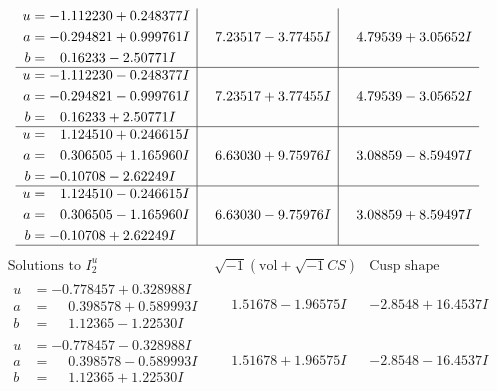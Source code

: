 \documentclass[1p]{elsarticle_modified}
\theoremstyle{definition}
\newcommand{\I}{\sqrt{-1}}
\begin{document}
$$\begin{array}{c|c|c}
\begin{aligned}
u &= -1.112230 + 0.248377 I \\
a &= -0.294821 + 0.999761 I \\
b &= \phantom{-}0.16233 - 2.50771 I\end{aligned}
 & \phantom{-}7.23517 - 3.77455 I & \phantom{-}4.79539 + 3.05652 I \\ \hline\begin{aligned}
u &= -1.112230 - 0.248377 I \\
a &= -0.294821 - 0.999761 I \\
b &= \phantom{-}0.16233 + 2.50771 I\end{aligned}
 & \phantom{-}7.23517 + 3.77455 I & \phantom{-}4.79539 - 3.05652 I \\ \hline\begin{aligned}
u &= \phantom{-}1.124510 + 0.246615 I \\
a &= \phantom{-}0.306505 + 1.165960 I \\
b &= -0.10708 - 2.62249 I\end{aligned}
 & \phantom{-}6.63030 + 9.75976 I & \phantom{-}3.08859 - 8.59497 I \\ \hline\begin{aligned}
u &= \phantom{-}1.124510 - 0.246615 I \\
a &= \phantom{-}0.306505 - 1.165960 I \\
b &= -0.10708 + 2.62249 I\end{aligned}
 & \phantom{-}6.63030 - 9.75976 I & \phantom{-}3.08859 + 8.59497 I\\
 \hline 
 \end{array}$$\newpage$$\begin{array}{c|c|c}  
\text{Solutions to }I^u_{2}& \I (\text{vol} + \sqrt{-1}CS) & \text{Cusp shape}\\
 \hline 
\begin{aligned}
u &= -0.778457 + 0.328988 I \\
a &= \phantom{-}0.398578 + 0.589993 I \\
b &= \phantom{-}1.12365 - 1.22530 I\end{aligned}
 & \phantom{-}1.51678 - 1.96575 I & -2.8548 + 16.4537 I \\ \hline\begin{aligned}
u &= -0.778457 - 0.328988 I \\
a &= \phantom{-}0.398578 - 0.589993 I \\
b &= \phantom{-}1.12365 + 1.22530 I\end{aligned}
 & \phantom{-}1.51678 + 1.96575 I & -2.8548 - 16.4537 I \\ \hline\begin{aligned}

\end{aligned}
\end{array}$$
\end{document}
